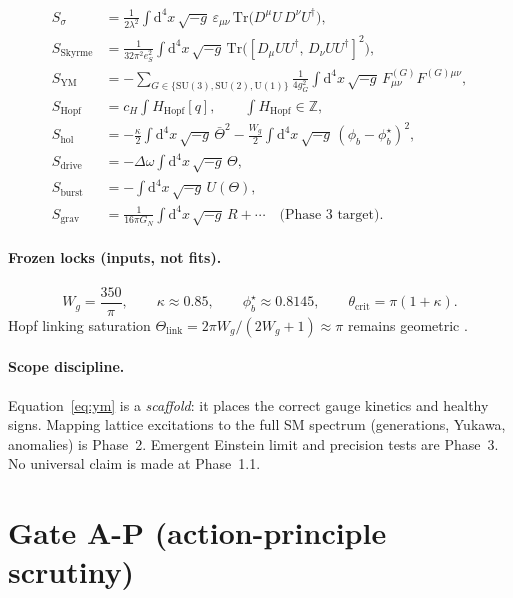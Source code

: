 \documentclass[11pt]{article}
\begin{document}
\begin{align}
S_\sigma
&=\frac{1}{2\lambda^2}\int\mathrm{d}^4x\,\sqrt{-g}\,
\varepsilon_{\mu\nu}\,\mathrm{Tr}\!\bigl(D^\mu U\,D^\nu U^\dagger\bigr),
\label{eq:sigma}
\\
S_{\mathrm{Skyrme}}
&=\frac{1}{32\pi^2 e_S^2}\int\mathrm{d}^4x\,\sqrt{-g}\,
\mathrm{Tr}\!\bigl([D_\mu U U^\dagger,\,D_\nu U U^\dagger]^2\bigr),
\label{eq:skyrme}
\\
S_{\mathrm{YM}}
&=-\sum_{G\in\{\mathrm{SU}(3),\mathrm{SU}(2),\mathrm{U}(1)\}}
\frac{1}{4g_G^2}\int\mathrm{d}^4x\,\sqrt{-g}\,
F_{\mu\nu}^{(G)}F^{(G)\mu\nu},
\label{eq:ym}
\\
S_{\mathrm{Hopf}}
&=c_H\int H_{\mathrm{Hopf}}[q],
\qquad \int H_{\mathrm{Hopf}}\in\mathbb{Z},
\label{eq:hopf}
\\
S_{\mathrm{hol}}
&=-\frac{\kappa}{2}\int\mathrm{d}^4x\,\sqrt{-g}\,\bar\Theta^2
-\frac{W_g}{2}\int\mathrm{d}^4x\,\sqrt{-g}\,(\phi_b-\phi_b^\star)^2,
\label{eq:hol}
\\
S_{\mathrm{drive}}
&=-\Delta\omega\int\mathrm{d}^4x\,\sqrt{-g}\,\Theta,
\label{eq:drive}
\\
S_{\mathrm{burst}}
&=-\int\mathrm{d}^4x\,\sqrt{-g}\,U(\Theta),
\label{eq:burst-S}
\\
S_{\mathrm{grav}}
&=\frac{1}{16\pi G_N}\int\mathrm{d}^4x\,\sqrt{-g}\,R+\cdots
\quad\text{(Phase~3 target)}.
\label{eq:grav}
\end{align}

\paragraph{Frozen locks (inputs, not fits).}
\[
W_g=\frac{350}{\pi},\qquad
\kappa\approx 0.85,\qquad
\phi_b^\star\approx 0.8145,\qquad
\theta_{\mathrm{crit}}=\pi(1+\kappa).
\]
Hopf linking saturation
$\Theta_{\mathrm{link}}=2\pi W_g/(2W_g+1)\approx\pi$ remains geometric
\cite{burst}.

\paragraph{Scope discipline.}
Equation~\eqref{eq:ym} is a \emph{scaffold}: it places the correct gauge kinetics
and healthy signs. Mapping lattice excitations to the full SM spectrum (generations,
Yukawa, anomalies) is Phase~2. Emergent Einstein limit and precision tests are Phase~3.
No universal claim is made at Phase~1.1.

\section{Gate A-P (action-principle scrutiny)}
\end{document}
